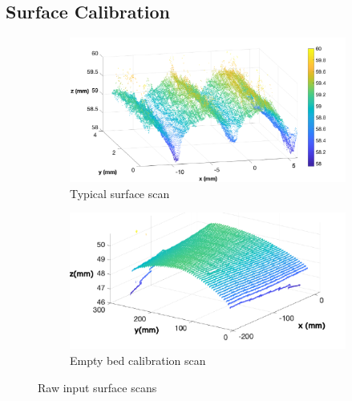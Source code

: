 \documentclass[12pt]{report}
\begin{document}
\subsection{Surface Calibration}
\begin{figure}[h!]
    \begin{subfigure}{0.5\textwidth}
        \centering
        \includegraphics[width=\textwidth]{figures/profile_measure/typical_scatter.pdf}
    \caption{Typical surface scan}
    \label{fig:typical_scatter}
    \end{subfigure}
    \begin{subfigure}{0.5\textwidth}
        \centering
        \includegraphics[width=\textwidth]{figures/profile_measure/calib_surf.pdf}
    \caption{Empty bed calibration scan}
    \label{fig:empty_calib}
    \end{subfigure}
    \caption{Raw input surface scans}
    \label{fig:rot_correction}
\end{figure}
\end{document}
